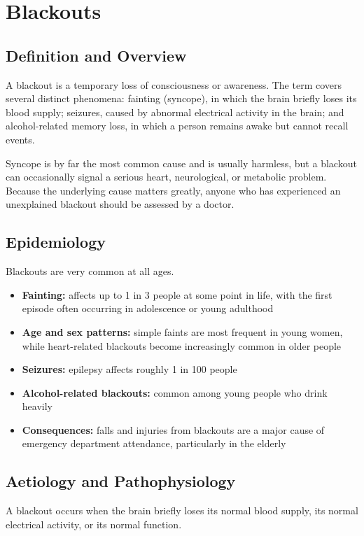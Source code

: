 \chapter{Blackouts}

\section*{Definition and Overview}
A blackout is a temporary loss of consciousness or awareness. The term covers several distinct phenomena: fainting (syncope), in which the brain briefly loses its blood supply; seizures, caused by abnormal electrical activity in the brain; and alcohol-related memory loss, in which a person remains awake but cannot recall events.

Syncope is by far the most common cause and is usually harmless, but a blackout can occasionally signal a serious heart, neurological, or metabolic problem. Because the underlying cause matters greatly, anyone who has experienced an unexplained blackout should be assessed by a doctor.

\section*{Epidemiology}
Blackouts are very common at all ages.

\begin{itemize}
    \item \textbf{Fainting:} affects up to 1 in 3 people at some point in life, with the first episode often occurring in adolescence or young adulthood
    \item \textbf{Age and sex patterns:} simple faints are most frequent in young women, while heart-related blackouts become increasingly common in older people
    \item \textbf{Seizures:} epilepsy affects roughly 1 in 100 people
    \item \textbf{Alcohol-related blackouts:} common among young people who drink heavily
    \item \textbf{Consequences:} falls and injuries from blackouts are a major cause of emergency department attendance, particularly in the elderly
\end{itemize}

\section*{Aetiology and Pathophysiology}
A blackout occurs when the brain briefly loses its normal blood supply, its normal electrical activity, or its normal function.

